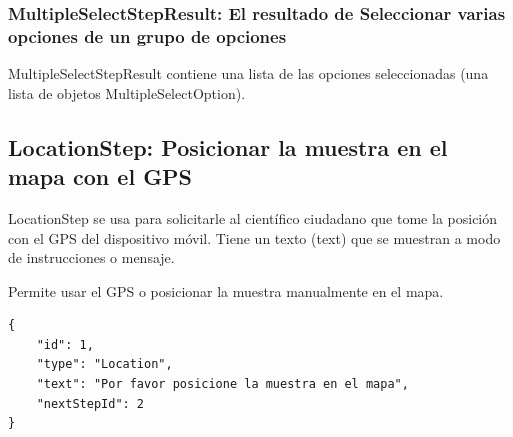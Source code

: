 \subsubsection{MultipleSelectStepResult: El resultado de Seleccionar varias opciones de un grupo de opciones}
MultipleSelectStepResult contiene una lista de las opciones seleccionadas (una lista de objetos MultipleSelectOption).





\subsection{LocationStep: Posicionar la muestra en el mapa con el GPS}
LocationStep se usa para solicitarle al científico ciudadano que tome la posición con el GPS del dispositivo móvil. Tiene un texto (text) que se muestran a modo de instrucciones o mensaje. 

Permite usar el GPS o posicionar la muestra manualmente en el mapa.

\clearpage

\begin{lstlisting}[language=XML, frame=tlbr, caption=LocationStep usando el generador de clases.]	
{
	"id": 1,
	"type": "Location",
	"text": "Por favor posicione la muestra en el mapa",
	"nextStepId": 2
}
\end{lstlisting}

